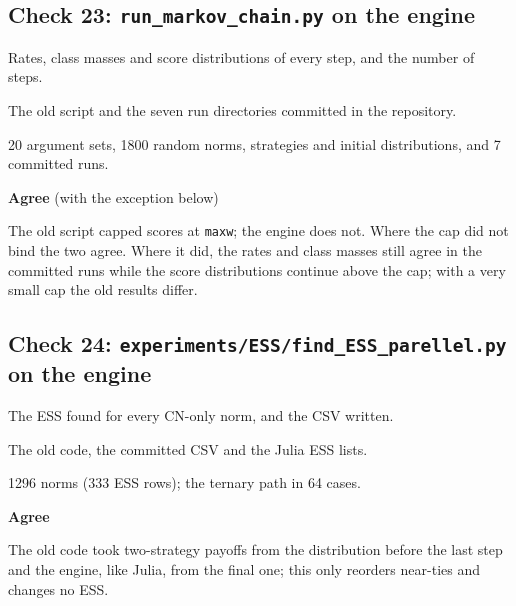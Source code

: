 \subsection*{Check 23: \texttt{run\_markov\_chain.py} on the engine}

\begin{description}\setlength\itemsep{0pt}

\item[What was checked] Rates, class masses and score distributions of every step, and the number of steps.

\item[Checked against] The old script and the seven run directories committed in the repository.

\item[How many] 20 argument sets, 1800 random norms, strategies and initial distributions, and 7 committed runs.

\item[Result] \textbf{Agree} (with the exception below)

\item[Note] The old script capped scores at \texttt{maxw}; the engine does not. Where the cap did not bind the two agree. Where it did, the rates and class masses still agree in the committed runs while the score distributions continue above the cap; with a very small cap the old results differ.

\end{description}


\subsection*{Check 24: \texttt{experiments/ESS/find\_ESS\_parellel.py} on the engine}

\begin{description}\setlength\itemsep{0pt}

\item[What was checked] The ESS found for every CN-only norm, and the CSV written.

\item[Checked against] The old code, the committed CSV and the Julia ESS lists.

\item[How many] 1296 norms (333 ESS rows); the ternary path in 64 cases.

\item[Result] \textbf{Agree}

\item[Note] The old code took two-strategy payoffs from the distribution before the last step and the engine, like Julia, from the final one; this only reorders near-ties and changes no ESS.

\end{description}


